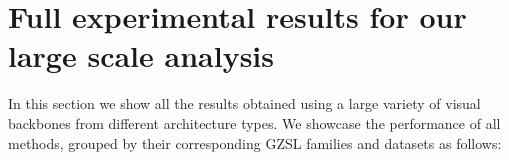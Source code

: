 \newcommand{\laplace}{\mathrm{Laplace}} %

\newcommand{\E}{\mathbb{E}}
\newcommand{\Ls}{\mathcal{L}}
\newcommand{\R}{\mathbb{R}}
\newcommand{\emp}{\tilde{p}}
\newcommand{\lr}{\alpha}
\newcommand{\reg}{\lambda}
\newcommand{\rect}{\mathrm{rectifier}}
\newcommand{\softmax}{\mathrm{softmax}}
\newcommand{\sigmoid}{\sigma}
\newcommand{\softplus}{\zeta}
\newcommand{\KL}{D_{\mathrm{KL}}}
\newcommand{\Var}{\mathrm{Var}}
\newcommand{\standarderror}{\mathrm{SE}}
\newcommand{\Cov}{\mathrm{Cov}}
\newcommand{\normlzero}{L^0}
\newcommand{\normlone}{L^1}
\newcommand{\normltwo}{L^2}
\newcommand{\normlp}{L^p}
\newcommand{\normmax}{L^\infty}

\newcommand{\parents}{Pa} %

\DeclareMathOperator*{\argmax}{arg\,max}
\DeclareMathOperator*{\argmin}{arg\,min}

\DeclareMathOperator{\sign}{sign}
\DeclareMathOperator{\Tr}{Tr}
\let\ab\allowbreak

\section{Full experimental results for our large scale analysis}
\label{sec:all_tables}

In this section we show all the results obtained using a large variety of visual backbones from different architecture types. We showcase the performance of all methods, grouped by their corresponding GZSL families and datasets as follows: 


